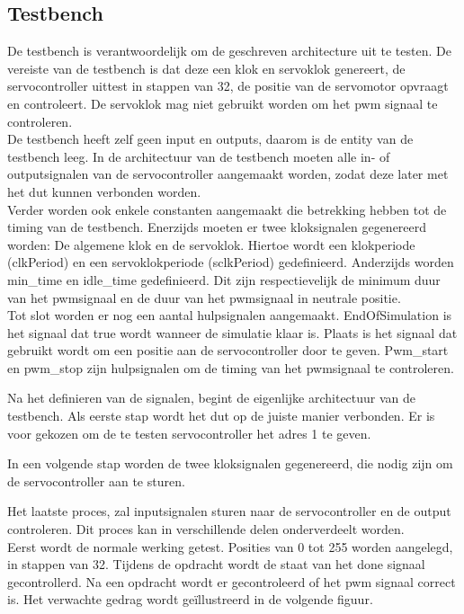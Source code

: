 \subsection{Testbench}

De testbench is verantwoordelijk om de geschreven architecture uit te testen. De vereiste van de testbench is dat deze een klok en servoklok genereert, de servocontroller uittest in stappen van 32, de positie van de servomotor opvraagt en controleert. De servoklok mag niet gebruikt worden om het \gls{pwm} signaal te controleren.\\

\noindent
De testbench heeft zelf geen input en outputs, daarom is de entity van de testbench leeg. In de architectuur van de testbench moeten alle in- of outputsignalen  van de servocontroller aangemaakt worden, zodat deze later met het \gls{dut} kunnen verbonden worden.\\

\noindent
Verder worden ook enkele constanten aangemaakt die betrekking hebben tot de timing van de testbench. Enerzijds moeten er twee kloksignalen gegenereerd worden: De algemene klok en de servoklok. Hiertoe wordt een klokperiode (clkPeriod) en een servoklokperiode (sclkPeriod) gedefinieerd. Anderzijds worden min\_time en idle\_time gedefinieerd. Dit zijn respectievelijk de minimum duur van het \gls{pwm}signaal en de duur van het \gls{pwm}signaal in neutrale positie.\\

\noindent
Tot slot worden er nog een aantal hulpsignalen aangemaakt. EndOfSimulation is het signaal dat true wordt wanneer de simulatie klaar is. Plaats is het signaal dat gebruikt wordt om een positie aan de servocontroller door te geven. Pwm\_start en pwm\_stop zijn hulpsignalen om de timing van het \gls{pwm}signaal te controleren. 


Na het definieren van de signalen, begint de eigenlijke architectuur van de testbench. Als eerste stap wordt het \gls{dut} op de juiste manier verbonden. Er is voor gekozen om de te testen servocontroller het adres 1 te geven.


In een volgende stap worden de twee kloksignalen gegenereerd, die nodig zijn om de servocontroller aan te sturen.

Het laatste proces, zal inputsignalen sturen naar de servocontroller en de output controleren. Dit proces kan in verschillende delen onderverdeelt worden.\\
\noindent
Eerst wordt de normale werking getest. Posities van 0 tot 255 worden aangelegd, in stappen van 32. Tijdens de opdracht wordt de staat van het done signaal gecontrollerd. Na een opdracht wordt er gecontroleerd of het \gls{pwm} signaal correct is. Het verwachte gedrag wordt ge\"{i}llustreerd in de volgende figuur.\\

